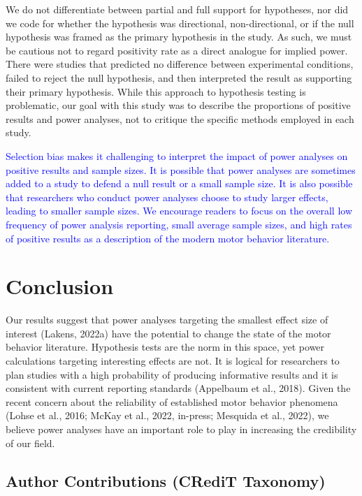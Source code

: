 \documentclass[
  man, donotrepeattitle,mask,floatsintext]{apa7}
\begin{document}
We do not differentiate between partial and full support for hypotheses, nor did we code for whether the hypothesis was directional, non-directional, or if the null hypothesis was framed as the primary hypothesis in the study. As such, we must be cautious not to regard positivity rate as a direct analogue for implied power. There were studies that predicted no difference between experimental conditions, failed to reject the null hypothesis, and then interpreted the result as supporting their primary hypothesis. While this approach to hypothesis testing is problematic, our goal with this study was to describe the proportions of positive results and power analyses, not to critique the specific methods employed in each study.

\textcolor{blue}{Selection bias makes it challenging to interpret the impact of power analyses on positive results and sample sizes. It is possible that power analyses are sometimes added to a study to defend a null result or a small sample size. It is also possible that researchers who conduct power analyses choose to study larger effects, leading to smaller sample sizes. We encourage readers to focus on the overall low frequency of power analysis reporting, small average sample sizes, and high rates of positive results as a description of the modern motor behavior literature.}

\hypertarget{conclusion}{%
\section{Conclusion}\label{conclusion}}

Our results suggest that power analyses targeting the smallest effect size of interest (Lakens, 2022a) have the potential to change the state of the motor behavior literature. Hypothesis tests are the norm in this space, yet power calculations targeting interesting effects are not. It is logical for researchers to plan studies with a high probability of producing informative results and it is consistent with current reporting standards (Appelbaum et al., 2018). Given the recent concern about the reliability of established motor behavior phenomena (Lohse et al., 2016; McKay et al., 2022, in-press; Mesquida et al., 2022), we believe power analyses have an important role to play in increasing the credibility of our field.

\vspace{5ex}

\hypertarget{author-contributions-credit-taxonomy}{%
\subsection{Author Contributions (CRediT Taxonomy)}\label{author-contributions-credit-taxonomy}}
\end{document}
